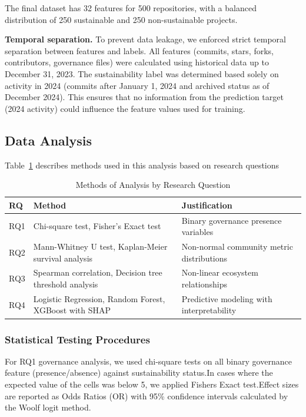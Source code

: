 \documentclass[conference]{IEEEtran}
\begin{document}
The final dataset has 32 features for 500 repositories, with a balanced distribution of 250 sustainable and 250 non-sustainable projects.

\textbf{Temporal separation.} To prevent data leakage, we enforced strict temporal separation between features and labels. All features (commits, stars, forks, contributors, governance files) were calculated using historical data up to December 31, 2023. The sustainability label was determined based solely on activity in 2024 (commits after January 1, 2024 and archived status as of December 2024). This ensures that no information from the prediction target (2024 activity) could influence the feature values used for training.

\subsection{Data Analysis}

Table~\ref{tab:analysis} describes methods used in this analysis based on research questions

\begin{table}[htbp]
\centering
\caption{Methods of Analysis by Research Question}
\label{tab:analysis}
\begin{tabular}{@{}p{0.8cm}p{3.5cm}p{3cm}@{}}
\toprule
\textbf{RQ} & \textbf{Method} & \textbf{Justification} \\
\midrule
RQ1 & Chi-square test, Fisher's Exact test & Binary governance presence variables \\
RQ2 & Mann-Whitney U test, Kaplan-Meier survival analysis & Non-normal community metric distributions \\
RQ3 & Spearman correlation, Decision tree threshold analysis & Non-linear ecosystem relationships \\
RQ4 & Logistic Regression, Random Forest, XGBoost with SHAP & Predictive modeling with interpretability \\
\bottomrule
\end{tabular}
\end{table}

\subsubsection{Statistical Testing Procedures}

For RQ1 governance analysis, we used chi-square tests on all binary governance feature (presence/absence) against sustainability status.In cases where the expected value of the cells was below 5, we applied Fishers Exact test.Effect sizes are reported as Odds Ratios (OR) with 95\% confidence intervals calculated by the Woolf logit method.
\end{document}
